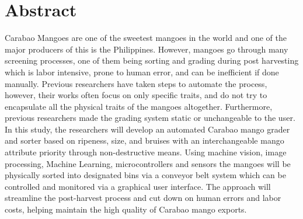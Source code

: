 \chapter*{Abstract}
Carabao Mangoes are one of the sweetest mangoes in the world and one
 of the major producers of this is the Philippines.
  However, mangoes go through many screening processes, one of them being 
  sorting and grading during post harvesting which is labor intensive, prone
   to human error, and can be inefficient if done manually. Previous researchers
    have taken steps to automate the process, however, their works often focus on 
    only specific traits, and do not try to encapsulate all the physical traits
     of the mangoes altogether. Furthermore, previous researchers made the grading 
     system static or unchangeable to the user. In this study, the researchers
      will develop an automated Carabao mango grader and sorter based on ripeness, 
      size, and bruises with an interchangeable mango attribute priority through 
      non-destructive means. Using machine vision, image processing, Machine Learning,
       microcontrollers and sensors the mangoes will be physically sorted into designated
        bins via a conveyor belt system which can be controlled and monitored via a graphical
         user interface. The approach will streamline the post-harvest process and cut down on 
         human errors and labor costs, helping maintain the high quality of Carabao mango exports. 
